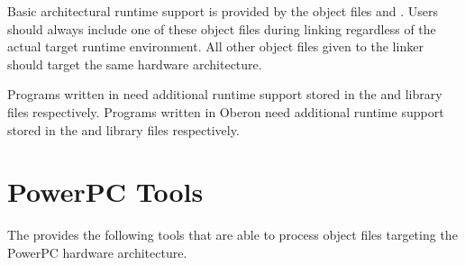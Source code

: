 Basic architectural runtime support is provided by the object files  and .
Users should always include one of these object files during linking regardless of the actual target runtime environment.
All other object files given to the linker should target the same hardware architecture.

Programs written in \cpp{} need additional runtime support stored in the  and  library files respectively.
Programs written in Oberon need additional runtime support stored in the  and  library files respectively.
\seecpp\seeoberon

\section{PowerPC Tools}

The \ecs{} provides the following tools that are able to process object files targeting the PowerPC hardware architecture.
\interface

\cdppca
\cdppcb
\cppppca
\cppppcb
\falppca
\falppcb
\obppca
\obppcb
\ppcaasm
\ppcbasm
\ppcadism
\ppcbdism
\linkbin

\concludechapter
